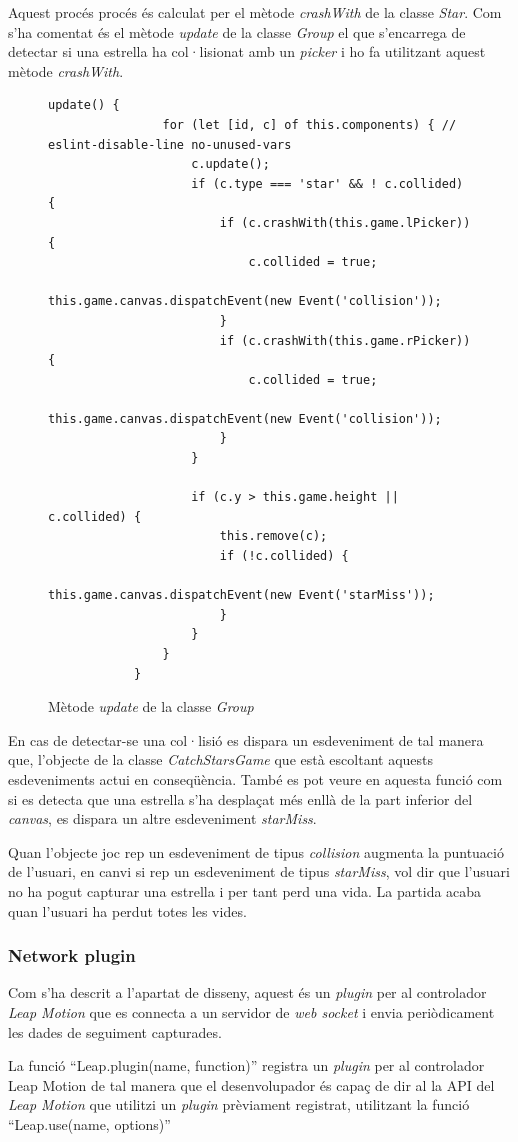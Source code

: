 \documentclass[12pt,a4paper,catalan]{article}
\begin{document}
	Aquest procés procés és calculat per el mètode \textit{crashWith} de la classe \textit{Star}. Com s'ha comentat és el mètode \textit{update} de la classe \textit{Group} el que s'encarrega de detectar si una estrella ha col·lisionat amb un \textit{picker} i ho fa utilitzant aquest mètode \textit{crashWith}.
	\begin{figure}[H]
		\begin{lstlisting}[gobble=12, tabsize=4]
			update() {
				for (let [id, c] of this.components) { // eslint-disable-line no-unused-vars
					c.update();
					if (c.type === 'star' && ! c.collided) {
						if (c.crashWith(this.game.lPicker)) {
							c.collided = true;
							this.game.canvas.dispatchEvent(new Event('collision'));
						}
						if (c.crashWith(this.game.rPicker)) {
							c.collided = true;
							this.game.canvas.dispatchEvent(new Event('collision'));
						}
					}
					
					if (c.y > this.game.height || c.collided) {
						this.remove(c);
						if (!c.collided) {
							this.game.canvas.dispatchEvent(new Event('starMiss'));
						}
					}
				}
			}
		\end{lstlisting}
		\caption{Mètode \textit{update} de la classe \textit{Group}}
		\label{fig:group-update}
	\end{figure}
	En cas de detectar-se una col·lisió es dispara un esdeveniment de tal manera que, l'objecte de la classe \textit{CatchStarsGame} que està escoltant aquests esdeveniments actui en conseqüència. També es pot veure en aquesta funció com si es detecta que una estrella s'ha desplaçat més enllà de la part inferior del \textit{canvas}, es dispara un altre esdeveniment \textit{starMiss}.
	
	Quan l'objecte joc rep un esdeveniment de tipus \textit{collision} augmenta la puntuació de l'usuari, en canvi si rep un esdeveniment de tipus \textit{starMiss}, vol dir que l'usuari no ha pogut capturar una estrella i per tant perd una vida. La partida acaba quan l'usuari ha perdut totes les vides.
	\subsubsection{Network plugin}
	Com s'ha descrit a l'apartat de disseny, aquest és un \textit{plugin} per al controlador \textit{Leap Motion} que es connecta a un servidor de \textit{web socket} i envia periòdicament les dades de seguiment capturades.
	
	La funció “Leap.plugin(name, function)” registra un \textit{plugin} per al controlador Leap Motion de tal manera que el desenvolupador és capaç de dir al la API del \textit{Leap Motion} que utilitzi un \textit{plugin} prèviament registrat, utilitzant la funció “Leap.use(name, options)”
	
\end{document}
